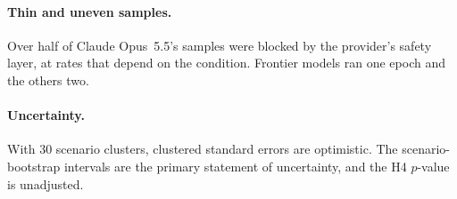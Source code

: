 \paragraph{Thin and uneven samples.} Over half of Claude Opus~5.5's samples
were blocked by the provider's safety layer, at rates that depend on the
condition. Frontier models ran one epoch and the others two.

\paragraph{Uncertainty.} With 30 scenario clusters, clustered standard errors
are optimistic. The scenario-bootstrap intervals are the primary statement of
uncertainty, and the H4 $p$-value is unadjusted.

